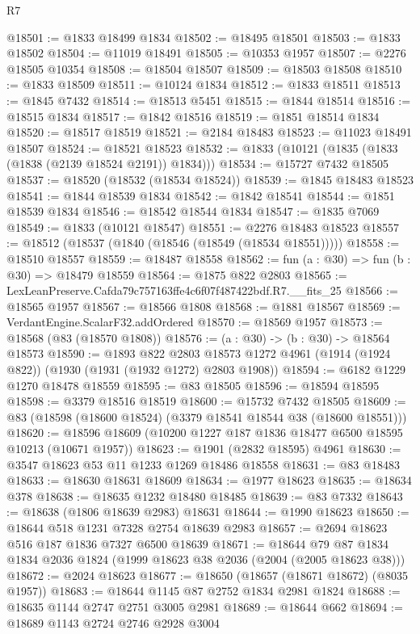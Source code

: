 \begin{lexlean}{R7}
\begin{coremodule}
@18501 := @1833 @18499 @1834
@18502 := @18495 @18501
@18503 := @1833 @18502
@18504 := @11019 @18491
@18505 := @10353 @1957
@18507 := @2276 @18505 @10354
@18508 := @18504 @18507
@18509 := @18503 @18508
@18510 := @1833 @18509
@18511 := @10124 @1834
@18512 := @1833 @18511
@18513 := @1845 @7432
@18514 := @18513 @5451
@18515 := @1844 @18514
@18516 := @18515 @1834
@18517 := @1842 @18516
@18519 := @1851 @18514 @1834
@18520 := @18517 @18519
@18521 := @2184 @18483
@18523 := @11023 @18491 @18507
@18524 := @18521 @18523
@18532 := @1833 (@10121 (@1835 (@1833 (@1838 (@2139 @18524 @2191)) @1834)))
@18534 := @15727 @7432 @18505
@18537 := @18520 (@18532 (@18534 @18524))
@18539 := @1845 @18483 @18523
@18541 := @1844 @18539 @1834
@18542 := @1842 @18541
@18544 := @1851 @18539 @1834
@18546 := @18542 @18544 @1834
@18547 := @1835 @7069
@18549 := @1833 (@10121 @18547)
@18551 := @2276 @18483 @18523
@18557 := @18512 (@18537 (@1840 (@18546 (@18549 (@18534 @18551)))))
@18558 := @18510 @18557
@18559 := @18487 @18558
@18562 := fun (a : @30) => fun (b : @30) => @18479 @18559
@18564 := @1875 @822 @2803
@18565 := LexLeanPreserve.Cafda79c757163ffe4c6f07f487422bdf.R7.__fits_25
@18566 := @18565 @1957
@18567 := @18566 @1808
@18568 := @1881 @18567
@18569 := VerdantEngine.ScalarF32.addOrdered
@18570 := @18569 @1957
@18573 := @18568 (@83 (@18570 @1808))
@18576 := (a : @30) -> (b : @30) -> @18564 @18573
@18590 := @1893
    @822
    @2803
    @18573
    @1272
    @4961
    (@1914 (@1924 @822))
    (@1930 (@1931 (@1932 @1272) @2803 @1908))
@18594 := @6182 @1229 @1270 @18478 @18559
@18595 := @83 @18505
@18596 := @18594 @18595
@18598 := @3379 @18516 @18519
@18600 := @15732 @7432 @18505
@18609 := @83 (@18598 (@18600 @18524) (@3379 @18541 @18544 @38 (@18600 @18551)))
@18620 := @18596 @18609 (@10200 @1227 @187 @1836 @18477 @6500 @18595 @10213 (@10671 @1957))
@18623 := @1901 (@2832 @18595) @4961
@18630 := @3547 @18623 @53 @11 @1233 @1269 @18486 @18558
@18631 := @83 @18483
@18633 := @18630 @18631 @18609
@18634 := @1977 @18623
@18635 := @18634 @378
@18638 := @18635 @1232 @18480 @18485
@18639 := @83 @7332
@18643 := @18638 (@1806 @18639 @2983) @18631
@18644 := @1990 @18623
@18650 := @18644 @518 @1231 @7328 @2754 @18639 @2983
@18657 := @2694 @18623 @516 @187 @1836 @7327 @6500 @18639
@18671 := @18644 @79 @87 @1834 @1834 @2036 @1824 (@1999 @18623 @38 @2036 (@2004 (@2005 @18623 @38)))
@18672 := @2024 @18623
@18677 := @18650 (@18657 (@18671 @18672) (@8035 @1957))
@18683 := @18644 @1145 @87 @2752 @1834 @2981 @1824
@18688 := @18635 @1144 @2747 @2751 @3005 @2981
@18689 := @18644 @662
@18694 := @18689 @1143 @2724 @2746 @2928 @3004

\end{coremodule}
\end{lexlean}
